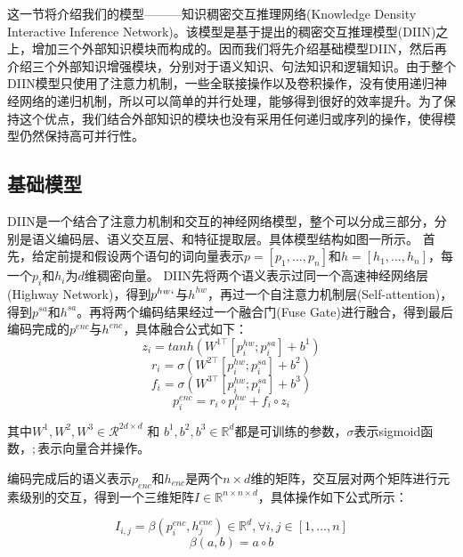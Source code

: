 \documentclass[UTF8,11pt,a4paper,nofonts]{ctexart}
\begin{document}
这一节将介绍我们的模型———知识稠密交互推理网络(Knowledge Density Interactive Inference Network)。该模型是基于\cite{yichen2018nli}提出的稠密交互推理模型(DIIN)之上，增加三个外部知识模块而构成的。因而我们将先介绍基础模型DIIN，然后再介绍三个外部知识增强模块，分别对于语义知识、句法知识和逻辑知识。由于整个DIIN模型只使用了注意力机制，一些全联接操作以及卷积操作，没有使用递归神经网络的递归机制，所以可以简单的并行处理，能够得到很好的效率提升。为了保持这个优点，我们结合外部知识的模块也没有采用任何递归或序列的操作，使得模型仍然保持高可并行性。

\subsection{基础模型}

DIIN是一个结合了注意力机制和交互的神经网络模型，整个可以分成三部分，分别是语义编码层、语义交互层、和特征提取层。具体模型结构如图一所示。
首先，给定前提和假设两个语句的词向量表示$p=[p_1,\dots,p_n]$和$h=[h_1, \dots, h_n]$，每一个$p_i$和$h_i$为$d$维稠密向量。
DIIN先将两个语义表示过同一个高速神经网络层(Highway Network)，得到$p^{hw}`$与$h^{hw}$，再过一个自注意力机制层(Self-attention)，得到$p^{sa}$和$h^{sa}$。再将两个编码结果经过一个融合门(Fuse Gate)进行融合，得到最后编码完成的$p^{enc}$与$h^{enc}$，具体融合公式如下：
\begin{equation}
z_i = tanh(W^{1\top}[p^{hw}_i;p^{sa}_i]+b^1)
\end{equation}
\begin{equation}
r_i = \sigma(W^{2\top}[p^{hw}_i;p^{sa}_i]+b^2)
\end{equation}
\begin{equation}
f_i = \sigma(W^{3\top}[p^{hw}_i;p^{sa}_i]+b^3)
\end{equation}
\begin{equation}
p^{enc}_i = r_i \circ p^{hw}_i + f_i \circ z_i
\end{equation}

其中$W^1, W^2, W^3 \in \mathcal{R}^{2d\times d}$ 和 $b^1, b^2, b^3 \in \mathbb{R}^d$都是可训练的参数，$\sigma$表示sigmoid函数，$;$表示向量合并操作。

编码完成后的语义表示$p_{enc}$和$h_{enc}$是两个$n\times d$维的矩阵，交互层对两个矩阵进行元素级别的交互，得到一个三维矩阵$I \in \mathbb{R}^{n\times n \times d}$，具体操作如下公式所示：

\begin{equation}
I_{i,j} = \beta(p^{enc}_i, h^{enc}_j) \in \mathbb{R}^d, \forall i, j \in [1,\dots,n]
\end{equation}
\begin{equation}
\beta(a, b) = a \circ b
\end{equation}
\end{document}

